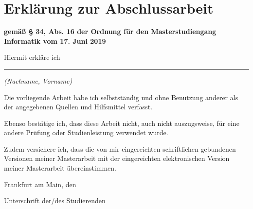 \chapter{Erklärung zur Abschlussarbeit}

\textbf{gemäß § 34, Abs. 16 der Ordnung für den Masterstudiengang Informatik vom 17. Juni 2019}

\vspace{3cm}

\noindent
Hiermit erkläre ich

\vspace{2cm}

\hrule

\smallskip

\noindent
{\small\itshape (Nachname, Vorname) }

\bigskip

\noindent
Die vorliegende Arbeit habe ich selbstständig und ohne Benutzung anderer als der angegebenen Quellen und Hilfsmittel verfasst.

\bigskip

\noindent
Ebenso bestätige ich, dass diese Arbeit nicht, auch nicht auszugsweise, für eine andere Prüfung oder Studienleistung verwendet wurde.

\bigskip

\noindent
Zudem versichere ich, dass die von mir eingereichten schriftlichen gebundenen Versionen meiner Masterarbeit mit der eingereichten elektronischen Version meiner Masterarbeit übereinstimmen.

\bigskip

\noindent
Frankfurt am Main, den \hspace{3cm}

\bigskip

\hspace{5cm}\hrulefill

\hspace{7cm}Unterschrift der/des Studierenden
